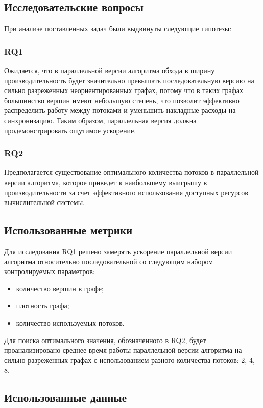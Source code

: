 \subsection{Исследовательские вопросы}
При анализе поставленных задач были выдвинуты следующие гипотезы:
{\parindent0pt
    
    \subsubsection*{RQ1}
    \label{RQ1}
    Ожидается, что в параллельной версии алгоритма обхода в ширину производительность будет значительно превышать последовательную версию на сильно разреженных неориентированных графах, потому что в таких графах большинство вершин имеют небольшую степень, что позволит эффективно распределить работу между потоками и уменьшить накладные расходы на синхронизацию. Таким образом, параллельная версия должна продемонстрировать ощутимое ускорение.
}
{\parindent0pt
    \subsubsection*{RQ2}
    \label{RQ2}
    Предполагается существование оптимального количества потоков в параллельной версии алгоритма, которое приведет к наибольшему выигрышу в производительности за счет эффективного использования доступных ресурсов вычислительной системы.
}

\subsection{Использованные метрики}

Для исследования \hyperref[RQ1]{RQ1} решено замерять ускорение параллельной версии алгоритма относительно последовательной со следующим набором контролируемых параметров:
\begin{itemize}
    \item количество вершин в графе;
    \item плотность графа;
    \item количество используемых потоков.
\end{itemize}

Для поиска оптимального значения, обозначенного в \hyperref[RQ2]{RQ2}, будет проанализировано среднее время работы параллельной версии алгоритма на сильно разреженных графах с использованием разного количества потоков: 2, 4, 8.

\subsection{Использованные данные}

